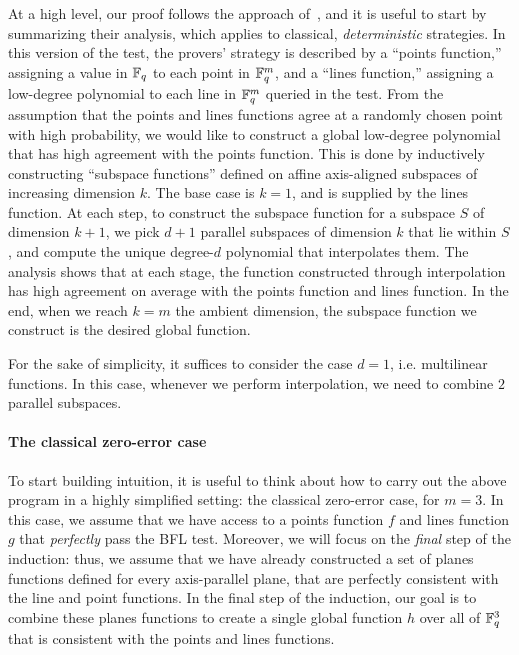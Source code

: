 At a high level, our proof follows the approach of~\cite{BFL91}, and
it is useful to start by summarizing their analysis, which applies to
classical, \emph{deterministic} strategies. In this version of the test, the provers' strategy is described
by a ``points function,'' assigning a value in $\mathbb F_q$ to each point in
$\mathbb F_q^m$, and a
``lines function,'' assigning a low-degree polynomial to each
line in $\mathbb F_q^{m}$ queried in the test. From the assumption that the
points and lines functions agree at a randomly chosen point with high
probability, we would like to construct a global low-degree polynomial that has high agreement with
the points function. This is done by inductively constructing
``subspace functions'' defined on affine axis-aligned subspaces of increasing
dimension $k$. The base case is $k=1$, and is supplied by the lines
function. At each step, to construct the subspace function for a
subspace $S$ of dimension $k+1$, we pick $d+1$ parallel subspaces of
dimension $k$ that lie within $S$, and compute the unique degree-$d$
polynomial that interpolates them. The analysis shows that at each
stage, the function constructed through interpolation has high
agreement on average with the points function and lines function. In
the end, when we reach $k=m$ the ambient dimension, the subspace
function we construct is the desired global function.

For the sake of simplicity, it suffices to consider the case $d=1$,
i.e. multilinear functions. In this case, whenever we perform
interpolation, we need to combine $2$ parallel subspaces.

\paragraph{The classical zero-error case}

To start building intuition, it is useful to think about how to carry
out the above program in a highly simplified setting: the classical
zero-error case, for $m=3$. In this case, we assume that we have access to a
points function $f$ and lines function $g$ that \emph{perfectly} pass the BFL
test. Moreover, we will focus on the \emph{final} step of the
induction: thus, we assume that we have already constructed a set of
planes functions defined for every axis-parallel plane, that are
perfectly consistent with the line and point functions. In the final
step of the induction, our goal is to combine these planes functions
to create a single global function $h$
over all of $\mathbb F_q^{3}$ that is consistent with the points and lines functions. 

